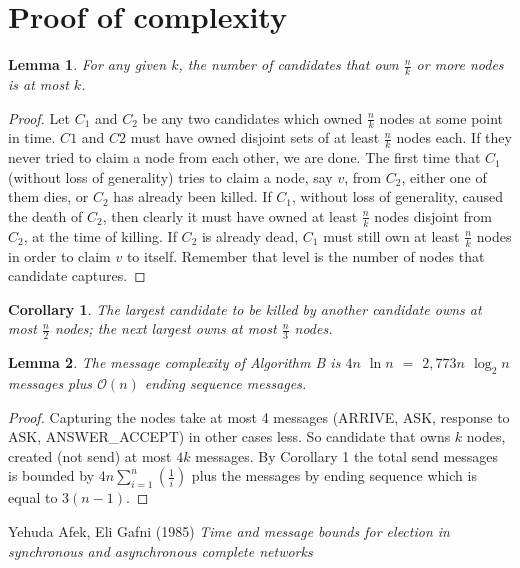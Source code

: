 \documentclass{article}
\newtheorem{lemma}{Lemma}
\newtheorem{corollary}[theorem]{Corollary}
\begin{document}
\section*{Proof of complexity}
\begin{lemma}
For any given \(k\), the number of candidates that own \(\frac{n}{k}\) or more nodes is at most \(k\). 
\end{lemma}
\begin{proof}
Let \(C_1\) and \(C_2\) be any two candidates which owned \(\frac{n}{k}\) nodes at some point in time. \(C1\) and \(C2\) must have owned disjoint sets of at least \(\frac{n}{k}\) nodes each. If they never tried to claim a node from each other, we are
done. The first time that \(C_1\) (without loss of generality) tries to claim a node, say \(v\),
from \(C_2\), either one of them dies, or \(C_2\) has already been killed. If \(C_1\), without loss
of generality, caused the death of \(C_2\), then clearly it must have owned at least \(\frac{n}{k}\)
nodes disjoint from \(C_2\), at the time of killing. If \(C_2\) is already dead, \(C_1\) must still own
at least \(\frac{n}{k}\) nodes in order to claim \(v\) to itself. Remember that level is the number of nodes that candidate captures.
\end{proof}
\begin{corollary}
The largest candidate to be killed by another candidate owns at most \(\frac{n}{2}\) nodes; the next largest owns at most \(\frac{n}{3}\) nodes.
\end{corollary}
\begin{lemma}
The message complexity of Algorithm B is \(4n\) \( \ln{n} \) \(=\) \(2,773n\) \( \log_2{n}\) messages plus \(\mathcal{O}(n)\) ending sequence messages.
\end{lemma}
\begin{proof}
Capturing the nodes take at most 4 messages (ARRIVE, ASK, response to ASK, ANSWER\_ACCEPT) in other cases less. So candidate that owns \(k\) nodes, created (not send) at most \(4k\) messages. By Corollary 1 the total send messages is bounded by \(4n\sum_{i=1}^n(\frac{1}{i})\) plus the messages by ending sequence which is equal to \(3(n-1)\).
\end{proof}


\begin{thebibliography}{9}
Yehuda Afek, Eli Gafni (1985)
\emph{Time and message bounds for election in
synchronous and asynchronous complete networks}
\end{thebibliography}
\end{document}
